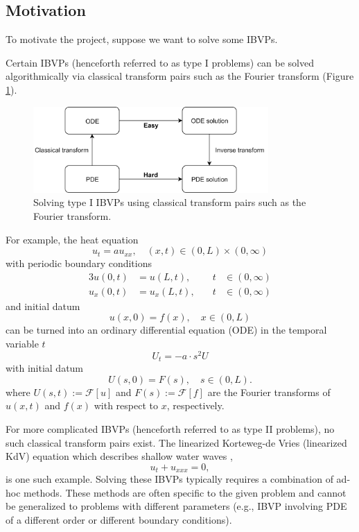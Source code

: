 \documentclass[11pt, oneside, a4paper]{article}
\begin{document}
\subsection{Motivation}\label{sec:motivation}
To motivate the project, suppose we want to solve some IBVPs.

Certain IBVPs (henceforth referred to as type I problems) can be solved algorithmically via classical transform pairs such as the Fourier transform (Figure \ref{fig:classical_transform}). 
\begin{figure}[htpb!]
    \centering
    \includegraphics[width=0.8\textwidth]{classical_transform.png}
    \caption{Solving type I IBVPs using classical transform pairs such as the Fourier transform.}
    \label{fig:classical_transform}
\end{figure}

\noindent For example, the heat equation \cite{Pinsky1991}
\[u_t = au_{xx},\quad (x,t)\in (0, L)\times (0,\infty)\]
with periodic boundary conditions
\begin{alignat*}{3}
    u(0, t) &= u(L, t),&\quad t&\in (0,\infty)\\
    u_x(0, t) &= u_x(L, t),&\quad t&\in (0,\infty)
\end{alignat*}
and initial datum
\[u(x,0) = f(x), \quad x\in (0, L)\]
can be turned into an ordinary differential equation (ODE) in the temporal variable $t$
\[U_t = -a\cdot s^2U\]
with initial datum
\[U(s,0) = F(s),\quad s\in (0,L).\]
where $U(s,t):=\mathcal{F}[u]$ and $F(s):=\mathcal{F}[f]$ are the Fourier transforms of $u(x,t)$ and $f(x)$ with respect to $x$, respectively. 


For more complicated IBVPs (henceforth referred to as type II problems), no such classical transform pairs exist. The linearized Korteweg-de Vries (linearized KdV) equation which describes shallow water waves \cite{Korteweg1895},
\begin{equation}\label{eq:linearied_kdv}
    u_t + u_{xxx} = 0,
\end{equation}
is one such example. Solving these IBVPs typically requires a combination of ad-hoc methods. These methods are often specific to the given problem and cannot be generalized to problems with different parameters (e.g., IBVP involving PDE of a different order or different boundary conditions). 
\end{document}
